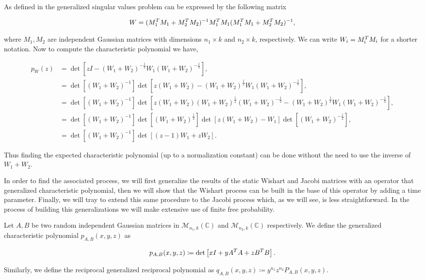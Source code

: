 As defined in \cite{doumerc2005matrices} the generalized singular values problem can be expressed by the following matrix

\begin{equation*}
    W = (M_1^TM_1 + M_2^TM_2)^{-1}M_1^TM_1(M_1^TM_1 + M_2^TM_2)^{-1},
\end{equation*}

\noindent where $M_1, M_2$ are independent Gaussian matrices with dimensions $n_1\times k$ and $n_2 \times k$, respectively.  We can write $W_i = M_i^TM_i$ for a shorter notation. Now to compute the characteristic polynomial we have,

\begin{align*}
    p_W(z) &= \det\left[ zI - (W_1+W_2)^{-\frac12}W_1(W_1+W_2)^{-\frac12} \right], \\ 
    &= \det\left[(W_1+W_2)^{-1}\right]\det\left[ z(W_1+W_2) - (W_1+W_2)^{\frac12}W_1(W_1+W_2)^{-\frac12} \right],\\ 
    &= \det\left[(W_1+W_2)^{-1}\right]\det\left[ z(W_1+W_2)(W_1+W_2)^{\frac12}(W_1+W_2)^{-\frac12} - (W_1+W_2)^{\frac12}W_1(W_1+W_2)^{-\frac12} \right], \\
    &= \det\left[(W_1+W_2)^{-1}\right]\det\left[(W_1+W_2)^{\frac12}\right]\det\left[ z(W_1 + W_2) - W_1\right]\det\left[(W_1+W_2)^{-\frac12}\right],\\ 
    &= \det\left[(W_1+W_2)^{-1}\right]\det\left[ (z-1)W_1 + zW_2 \right].
\end{align*}

Thus finding the expected characteristic polynomial (up to a normalization constant) can be done without the need to use the inverse of $W_1 + W_2$.

In order to find the associated process, we will first generalize the results of the static Wishart and Jacobi matrices with an operator that generalized characteristic polynomial, then we will show that the Wishart process can be built in the base of this operator by adding a time parameter. Finally, we will tray to extend this same procedure to the Jacobi process which, as we will see, is less straightforward. In the process of building this generalizations we will make extensive use of finite free probability.

\begin{definition}
    Let $A, B$ be two random independent Gaussian matrices in $\mathcal M_{n_1,k}(\mathbb C)$ and $\mathcal M_{n_2,k}(\mathbb C)$ respectively. We define the generalized characteristic polynomial $p_{A,B}(x,y,z)$ as

    \begin{equation*}
        p_{A,B}(x,y,z) \coloneqq \det\left[ xI + y A^TA + z B^TB \right].
    \end{equation*}

    Similarly, we define the reciprocal generalized reciprocal polynomial as $q_{A,B}(x,y,z) \coloneqq y^{n_1}z^{n_2}P_{A,B}(x,y,z)$.
\end{definition}

